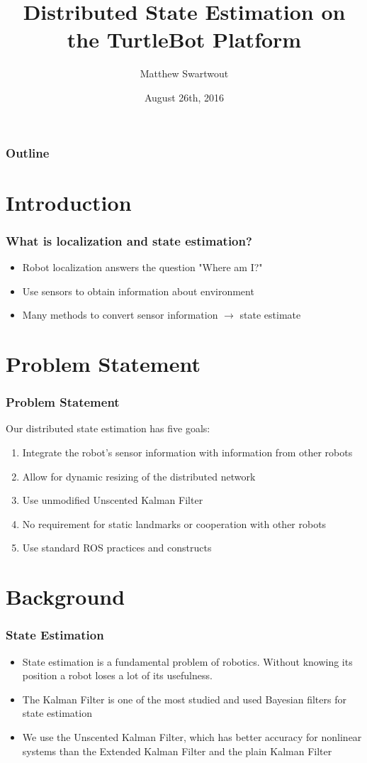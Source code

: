 \documentclass{beamer}
\title{Distributed State Estimation on the TurtleBot Platform}
\author{Matthew Swartwout}
\date{August 26th, 2016}
\begin{document}
\begin{frame}
    \titlepage
\end{frame}

\begin{frame}
\frametitle{Outline}
\tableofcontents
\end{frame}

\section{Introduction}
\begin{frame}
\frametitle{What is localization and state estimation?}
\begin{itemize}
\item Robot localization answers the question "Where am I?"
\item Use sensors to obtain information about environment
\item Many methods to convert sensor information $\rightarrow$ state estimate 
\end{itemize}
\end{frame}

\section{Problem Statement}
\begin{frame}
\frametitle{Problem Statement}
Our distributed state estimation has five goals:
\begin{enumerate}
\item Integrate the robot's sensor information with information from other robots
\item Allow for dynamic resizing of the distributed network
\item Use unmodified Unscented Kalman Filter
\item No requirement for static landmarks or cooperation with other robots
\item Use standard ROS practices and constructs
\end{enumerate}
\end{frame}

\section{Background}

\begin{frame}
\frametitle{State Estimation}
\begin{itemize}
\item State estimation is a fundamental problem of robotics. Without knowing its position a robot loses a lot of its usefulness.
\item The Kalman Filter is one of the most studied and used Bayesian filters for state estimation \cite{Localization2003, Mohsin2014}
\item We use the Unscented Kalman Filter, which has better accuracy for nonlinear systems than the Extended Kalman Filter and the plain Kalman Filter
\end{itemize}
\end{frame}
\end{document}
